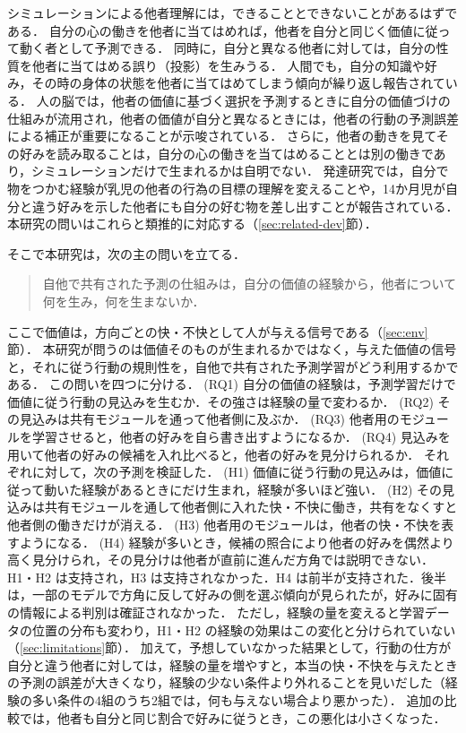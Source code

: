 シミュレーションによる他者理解には，できることとできないことがあるはずである．
自分の心の働きを他者に当てはめれば，他者を自分と同じく価値に従って動く者として予測できる．
同時に，自分と異なる他者に対しては，自分の性質を他者に当てはめる誤り（投影）を生みうる．
人間でも，自分の知識や好み，その時の身体の状態を他者に当てはめてしまう傾向が繰り返し報告されている\cite{ross1977false,nickerson1999how,vanboven2003social,epley2004perspective}．
人の脳では，他者の価値に基づく選択を予測するときに自分の価値づけの仕組みが流用され，他者の価値が自分と異なるときには，他者の行動の予測誤差による補正が重要になることが示唆されている\cite{suzuki2012learning}．
さらに，他者の動きを見てその好みを読み取ることは，自分の心の働きを当てはめることとは別の働きであり，シミュレーションだけで生まれるかは自明でない．
発達研究では，自分で物をつかむ経験が乳児の他者の行為の目標の理解を変えること\cite{sommerville2005action}や，14か月児が自分と違う好みを示した他者にも自分の好む物を差し出すこと\cite{repacholi1997early}が報告されている．
本研究の問いはこれらと類推的に対応する（\ref{sec:related-dev}節）．

そこで本研究は，次の主の問いを立てる．
\begin{quote}
  自他で共有された予測の仕組みは，自分の価値の経験から，他者について何を生み，何を生まないか．
\end{quote}
ここで価値は，方向ごとの快・不快として人が与える信号である（\ref{sec:env}節）．
本研究が問うのは価値そのものが生まれるかではなく，与えた価値の信号と，それに従う行動の規則性を，自他で共有された予測学習がどう利用するかである．
この問いを四つに分ける．
(RQ1) 自分の価値の経験は，予測学習だけで価値に従う行動の見込みを生むか．その強さは経験の量で変わるか．
(RQ2) その見込みは共有モジュールを通って他者側に及ぶか．
(RQ3) 他者用のモジュールを学習させると，他者の好みを自ら書き出すようになるか．
(RQ4) 見込みを用いて他者の好みの候補を入れ比べると，他者の好みを見分けられるか．
それぞれに対して，次の予測を検証した．
(H1) 価値に従う行動の見込みは，価値に従って動いた経験があるときにだけ生まれ，経験が多いほど強い．
(H2) その見込みは共有モジュールを通して他者側に入れた快・不快に働き，共有をなくすと他者側の働きだけが消える．
(H3) 他者用のモジュールは，他者の快・不快を表すようになる．
(H4) 経験が多いとき，候補の照合により他者の好みを偶然より高く見分けられ，その見分けは他者が直前に進んだ方角では説明できない．
H1・H2 は支持され，H3 は支持されなかった．H4 は前半が支持された．後半は，一部のモデルで方角に反して好みの側を選ぶ傾向が見られたが，好みに固有の情報による判別は確証されなかった．
ただし，経験の量を変えると学習データの位置の分布も変わり，H1・H2 の経験の効果はこの変化と分けられていない（\ref{sec:limitations}節）．
加えて，予想していなかった結果として，行動の仕方が自分と違う他者に対しては，経験の量を増やすと，本当の快・不快を与えたときの予測の誤差が大きくなり，経験の少ない条件より外れることを見いだした（経験の多い条件の4組のうち2組では，何も与えない場合より悪かった）．
追加の比較では，他者も自分と同じ割合で好みに従うとき，この悪化は小さくなった．

